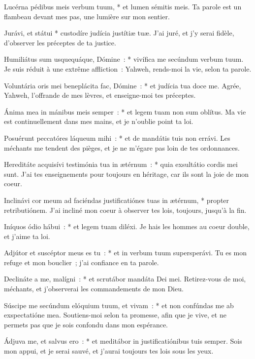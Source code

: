 \begin{paracol}{2}

\LigneParacol
{Lucérna pédibus meis verbum tuum, * et lumen sémitis meis.}
{Ta parole est un flambeau devant mes pas, une lumière sur mon sentier.}

\LigneParacol
{Jurávi, et státui * custodíre judícia justítiæ tuæ.}
{J'ai juré, et j'y serai fidèle, d'observer les préceptes de ta justice.}

\LigneParacol
{Humiliátus sum usquequáque, Dómine~: * vivífica me secúndum verbum tuum.}
{Je suis réduit à une extrême affliction~: Yahweh, rends-moi la vie, selon ta parole.}

\LigneParacol
{Voluntária oris mei beneplácita fac, Dómine~: * et judícia tua doce me.}
{Agrée, Yahweh, l'offrande de mes lèvres, et enseigne-moi tes préceptes.}

\LigneParacol
{Ánima mea in mánibus meis semper~: * et legem tuam non sum oblítus.}
{Ma vie est continuellement dans mes mains, et je n'oublie point ta loi.}

\LigneParacol
{Posuérunt peccatóres láqueum mihi~: * et de mandátis tuis non errávi.}
{Les méchants me tendent des pièges, et je ne m'égare pas loin de tes ordonnances.}

\LigneParacol
{Hereditáte acquisívi testimónia tua in ætérnum~: * quia exsultátio cordis mei sunt.}
{J'ai tes enseignements pour toujours en héritage, car ils sont la joie de mon coeur.}

\LigneParacol
{Inclinávi cor meum ad faciéndas justificatiónes tuas in ætérnum, * propter retributiónem.}
{J'ai incliné mon coeur à observer tes lois, toujours, jusqu'à la fin. }

\LigneParacol
{Iníquos ódio hábui~: * et legem tuam diléxi.}
{Je hais les hommes au coeur double, et j'aime ta loi.}

\LigneParacol
{Adjútor et suscéptor meus es tu~: * et in verbum tuum supersperávi.}
{Tu es mon refuge et mon bouclier~; j'ai confiance en ta parole.}

\LigneParacol
{Declináte a me, malígni~: * et scrutábor mandáta Dei mei.}
{Retirez-vous de moi, méchants, et j'observerai les commandements de mon Dieu.}

\LigneParacol
{Súscipe me secúndum elóquium  tuum, et vivam~: * et non confúndas me ab exspectatióne mea.}
{Soutiens-moi selon ta promesse, afin que je vive, et ne permets pas que je sois confondu dans mon espérance.}

\LigneParacol
{Ádjuva me, et salvus ero~: * et meditábor in justificatiónibus tuis semper.}
{Sois mon appui, et je serai sauvé, et j'aurai toujours tes lois sous les yeux.}


\end{paracol}
